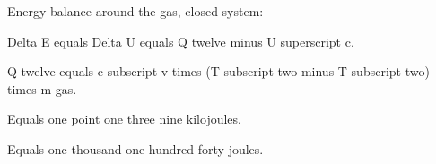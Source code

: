 Energy balance around the gas, closed system:

Delta E equals Delta U equals Q twelve minus U superscript c.

Q twelve equals c subscript v times (T subscript two minus T subscript two) times m gas.

Equals one point one three nine kilojoules.

Equals one thousand one hundred forty joules.